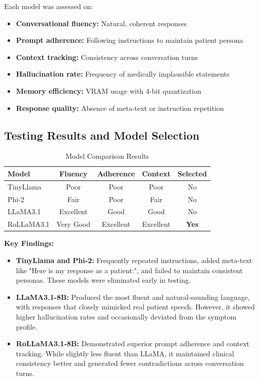 \documentclass[runningheads,a4paper,11pt]{report}
\begin{document}
Each model was assessed on:
\begin{itemize}
\item \textbf{Conversational fluency:} Natural, coherent responses
\item \textbf{Prompt adherence:} Following instructions to maintain patient persona
\item \textbf{Context tracking:} Consistency across conversation turns
\item \textbf{Hallucination rate:} Frequency of medically implausible statements
\item \textbf{Memory efficiency:} VRAM usage with 4-bit quantization
\item \textbf{Response quality:} Absence of meta-text or instruction repetition
\end{itemize}

\subsection{Testing Results and Model Selection}

\begin{table}[htbp]
\caption{Model Comparison Results}
\label{tab:modelComparison}
\begin{center}
\begin{tabular}{|l|c|c|c|c|}
\hline
\textbf{Model} & \textbf{Fluency} & \textbf{Adherence} & \textbf{Context} & \textbf{Selected} \\
\hline
TinyLlama & Poor & Poor & Poor & No \\
Phi-2 & Fair & Poor & Fair & No \\
LLaMA3.1 & Excellent & Good & Good & No \\
RoLLaMA3.1 & Very Good & Excellent & Excellent & \textbf{Yes} \\
\hline
\end{tabular}
\end{center}
\end{table}

\textbf{Key Findings:}

\begin{itemize}
\item \textbf{TinyLlama and Phi-2:} Frequently repeated instructions, added meta-text like "Here is my response as a patient:", and failed to maintain consistent personas. These models were eliminated early in testing.

\item \textbf{LLaMA3.1-8B:} Produced the most fluent and natural-sounding language, with responses that closely mimicked real patient speech. However, it showed higher hallucination rates and occasionally deviated from the symptom profile.

\item \textbf{RoLLaMA3.1-8B:} Demonstrated superior prompt adherence and context tracking. While slightly less fluent than LLaMA, it maintained clinical consistency better and generated fewer contradictions across conversation turns.
\end{itemize}
\end{document}
